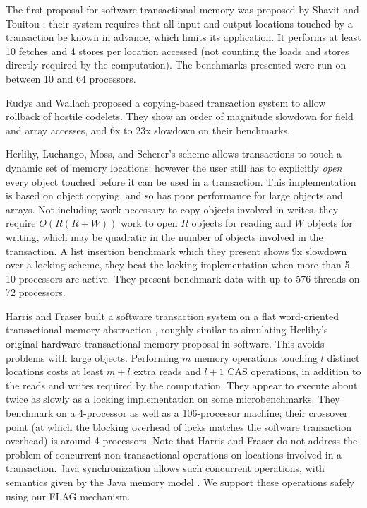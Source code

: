 \documentclass[12pt,oneside]{article}
\begin{document}
The first proposal for software transactional memory was proposed by
Shavit and Touitou \cite{ShavitTo95}; their system requires that all
input and output locations touched by a transaction be known in
advance, which limits its application.  It performs at least 10
fetches and 4 stores per location accessed (not counting the loads and
stores directly required by the computation).  The benchmarks
presented were run on between 10 and 64 processors.

Rudys and Wallach \cite{RudysWa02} proposed a copying-based
transaction system to allow rollback of hostile codelets.
They show an order of magnitude slowdown for field and array
accesses, and 6x to 23x slowdown on their benchmarks.

Herlihy, Luchango, Moss, and Scherer's scheme \cite{HerlihyLuMoSc03}
allows transactions to touch a dynamic set of memory locations;
however the user still has to explicitly \emph{open} every object touched
before it can be used in a transaction.  This implementation is based
on object copying, and so has poor performance for large objects and
arrays.  Not including work necessary to copy objects involved in
writes, they require $O(R(R+W))$ work to open $R$ objects for reading
and $W$ objects for writing, which may be quadratic in the number of objects
involved in the transaction.   A list insertion benchmark which they
present shows 9x slowdown over a locking scheme, they beat the locking
implementation when more than 5-10 processors are active.  They
present benchmark data with up to 576 threads on 72 processors.

Harris and Fraser built a software transaction system on a flat
word-oriented transactional memory abstraction \cite{HarrisFr03},
roughly similar to simulating Herlihy's original hardware
transactional memory proposal in software.  This avoids problems with
large objects.  Performing $m$ memory operations touching $l$ distinct
locations costs at least $m+l$ extra reads and $l+1$ CAS operations, in
addition to the reads and writes required by the computation.
They appear to execute about twice as slowly as a locking
implementation on some microbenchmarks.  They benchmark on a
4-processor as well as a 106-processor machine; their crossover point
(at which the blocking overhead of locks matches the software
transaction overhead) is around 4 processors.
Note that Harris and Fraser do not address the problem of
concurrent non-transactional operations on locations involved in a
transaction.  Java synchronization allows such concurrent operations,
with semantics given by the Java memory model \cite{MansonPu02}.
We support these operations safely using our FLAG mechanism.
\end{document}
